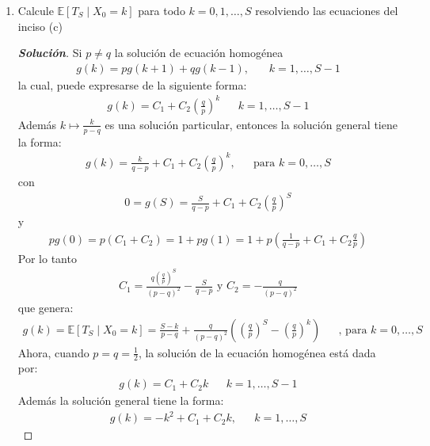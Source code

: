 \documentclass[12pt, letterpaper]{article}
\newenvironment{manualtheorem}[1]{%
  \renewcommand\themanualtheoreminner{#1}%
  \manualtheoreminner
}{\endmanualtheoreminner}
\newenvironment{solucion}
  {\renewcommand\qedsymbol{$\square$}\begin{proof}[\textbf{Solución}]}
  {\end{proof}}
\begin{document}
\begin{manualtheorem}{3.2}
\begin{enumerate}
        \item Calcule $\mathbb{E}[T_S \mid X_0 = k]$ para todo $k=0,1,\dots,S$ resolviendo las ecuaciones del inciso (c)
        \begin{solucion}
            Si $p\neq q$ la solución de ecuación homogénea
            \begin{align*}
                g(k)=pg(k+1)+qg(k-1)\textrm{, } & & k=1,\dots,S-1
            \end{align*}
            la cual, puede expresarse de la siguiente forma:
            \begin{align*}
                g(k)=C_1+C_2\left(\frac{q}{p}\right)^k & & k=1,\dots,S-1
            \end{align*}
            Además $k \mapsto \frac{k}{p-q}$ es una solución particular, entonces la solución general tiene la forma:
            \begin{align*}
                g(k)=\frac{k}{q-p}+C_1+C_2\left(\frac{q}{p}\right)^k, & &\textrm{para }k=0,\dots,S
            \end{align*}
            con
            \begin{align*}
                0=g(S)=\frac{S}{q-p}+C_1+C_2\left(\frac{q}{p}\right)^S
            \end{align*}
            y
            \begin{align*}
                pg(0)=p(C_1+C_2)=1+pg(1)=1+p\left(\frac{1}{q-p}+C_1+C_2\frac{q}{p}\right)
            \end{align*}
            Por lo tanto
            \begin{align*}
                C_1=\frac{q\left(\frac{q}{p}\right)^S}{(p-q)^2}-\frac{S}{q-p} \textrm{ y } C_2=-\frac{q}{(p-q)^2}
            \end{align*}
            que genera:
            \begin{align*}
            g(k)=\mathbb{E}[T_S \mid X_0 = k]=\frac{S-k}{p-q}+\frac{q}{(p-q)^2}\left(\left(\frac{q}{p}\right)^S-\left(\frac{q}{p}\right)^k\right)& &\textrm{, para }k=0,\dots,S
            \end{align*}
            Ahora, cuando $p=q=\frac{1}{2}$, la solución de la ecuación homogénea está dada por:
            \begin{align*}
                g(k)=C_1+C_2k & & k=1,\dots,S-1
            \end{align*}
            Además la solución general tiene la forma:
            \begin{align*}
                g(k)=-k^2+C_1+C_2k, & & k=1,\dots,S

\end{align*}
\end{solucion}
\end{enumerate}
\end{manualtheorem}
\end{document}
